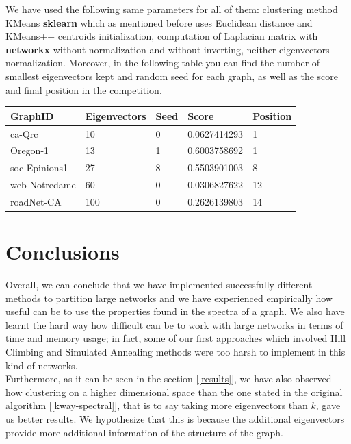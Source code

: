\documentclass[11pt]{extarticle}
\begin{document}
We have used the following same parameters for all of them: clustering method KMeans \textbf{sklearn} which as mentioned before uses Euclidean distance and KMeans++ centroids initialization, computation of Laplacian matrix with \textbf{networkx} without normalization and without inverting, neither eigenvectors normalization. Moreover, in the following table you can find the number of smallest eigenvectors kept and random seed for each graph, as well as the score and final position in the competition.

\begin{table}[H]
\centering
\begin{tabular}{|l|l|l|l|l|}
\hline
\textbf{GraphID} & \textbf{Eigenvectors} & \textbf{Seed} & \textbf{Score} & \textbf{Position}\\ \hline
ca-Qrc & 10 & 0  & 0.0627414293 & 1\\ \hline
Oregon-1 & 13 & 1 & 0.6003758692 & 1\\ \hline
soc-Epinions1 & 27 & 8 & 0.5503901003 & 8\\ \hline
web-Notredame & 60 & 0 & 0.0306827622 & 12\\ \hline
roadNet-CA & 100 & 0 & 0.2626139803 & 14\\ \hline
\end{tabular}
\end{table}

\section{Conclusions}

Overall, we can conclude that we have implemented successfully different methods to partition large networks and we have experienced empirically how useful can be to use the properties found in the spectra of a graph. We also have learnt the hard way how difficult can be to work with large networks in terms of time and memory usage; in fact, some of our first approaches which involved Hill Climbing and Simulated Annealing methods were too harsh to implement in this kind of networks.\\

Furthermore, as it can be seen in the section [\ref{results}], we have also observed how clustering on a higher dimensional space than the one stated in the original algorithm [\ref{kway-spectral}], that is to say taking more eigenvectors than $k$, gave us better results. We hypothesize that this is because the additional eigenvectors provide more additional information of the structure of the graph.  

\newpage

  

\end{document}
